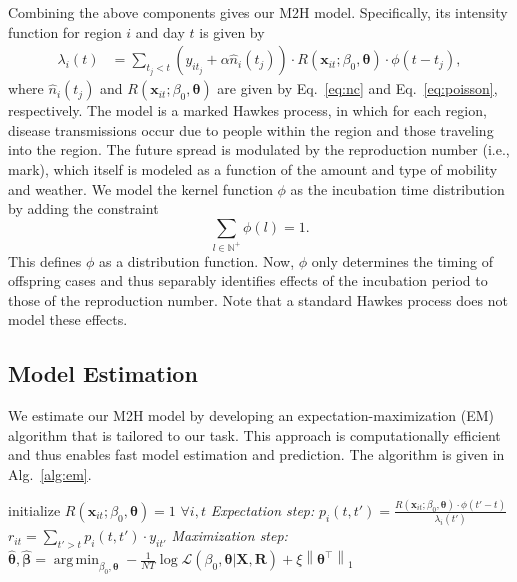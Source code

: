 \documentclass[sigconf, review = false, nonacm = true]{acmart}
\newcommand\model{M2H model\xspace}
\DeclareMathOperator*{\argmin}{arg\,min}
\newcommand{\norm}[1]{\left\lVert#1\right\rVert}
\begin{document}
Combining the above components gives our \model. Specifically, its intensity function for region $i$ and day $t$ is given by
\begin{align}
    \lambda_i(t) 
    &= \sum_{t_j < t} (y_{it_j}+\alpha \hat n_i(t_j)) \cdot R(\bm x_{it}; \beta_0, \bm \theta)\cdot \phi(t-t_j),
\end{align}
where $\hat n_i(t_j)$ and $R(\bm x_{it}; \beta_0, \bm \theta)$ are given by Eq.~\ref{eq:nc} and  Eq.~\ref{eq:poisson}, respectively. The model is a marked Hawkes process, in which for each region, disease transmissions occur due to people within the region and those traveling into the region. The future spread is modulated by the reproduction number (i.e., mark), which itself is modeled as a function of the amount and type of mobility and weather. We model the kernel function $\phi$ as the incubation time distribution by adding the constraint
\begin{equation}
    \sum_{l \in \mathbb N^+} \phi(l) = 1.
\end{equation}
This defines $\phi$ as a distribution function. Now, $\phi$ only determines the timing of offspring cases and thus separably identifies effects of the incubation period to those of the reproduction number. Note that a standard Hawkes process does not model these effects. 


\subsection{Model Estimation}
\label{sec:estimation}
We estimate our \model by developing an expectation-maximization (EM) algorithm \cite{dempster_maximum_1977} that is tailored to our task. This approach is computationally efficient and thus enables fast model estimation and prediction. The algorithm is given in Alg.~\ref{alg:em}.

\begin{algorithm}[H]
\small
	\caption{EM algorithm for the \model} 
	\label{alg:em}
	\begin{algorithmic}[1]
	\State initialize $R(\bm x_{it};\beta_0, \bm \theta) = 1$ $\forall i,t$
	\While {$\norm{\Delta \bm \theta }_1 >$ \text{tol} }
		 \State \textit{Expectation step:}
			   \State $p_i(t,t') = \frac{R(\bm x_{it};\beta_0, \bm \theta) \cdot \phi(t'-t)}{\lambda_i(t')}$
			    \EndFor
			   \State $r_{it} = \sum_{t' > t} p_i(t,t') \cdot y_{it'}$
			   \EndFor
			\EndFor
		\State \textit{Maximization step:}
		\State $\hat{\bm \theta}, \hat{\bm \beta}= \argmin_{\beta_0,\bm \theta} - \frac{1}{NT} \log \mathscr L(\beta_0, \bm \theta | \bm X, \bm R) + \xi
		\norm{\bm \theta^\top}_1$
	\EndWhile
	\EndProcedure
	\end{algorithmic}
\end{algorithm}
\end{document}
